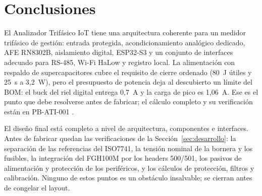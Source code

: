 \documentclass[11pt,a4paper]{article}
\begin{document}
\section{Conclusiones}

El Analizador Trifásico IoT tiene una arquitectura coherente para un medidor
trifásico de gestión: entrada protegida, acondicionamiento analógico dedicado,
AFE RN8302B, aislamiento digital, ESP32-S3 y un conjunto de interfaces adecuado
para RS-485, Wi-Fi HaLow y registro local. La alimentación con respaldo de
supercapacitores cubre el requisito de cierre ordenado (80~J útiles y 25~s a
3,2~W), pero el presupuesto de potencia deja al descubierto un límite del BOM:
el buck del riel digital entrega 0,7~A y la carga de pico es 1,06~A. Ese es el
punto que debe resolverse antes de fabricar; el cálculo completo y su
verificación están en PB-ATI-001 \cite{pbati}.

El diseño final está completo a nivel de arquitectura, componentes e
interfaces. Antes de fabricar quedan las verificaciones de la
Sección~\ref{sec:desarrollo}: la separación de las referencias del ISO7741, la
tensión nominal de la bornera y los fusibles, la integración del FGH100M por
los headers 500/501, los pasivos de alimentación y protección de los
periféricos, y los cálculos de protección, filtros y calibración. Ninguno de
estos puntos es un obstáculo insalvable; se cierran antes de congelar el layout.
\end{document}
